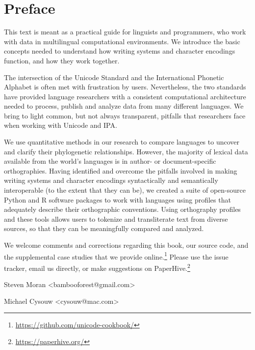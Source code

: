 \chapter{Preface}
\label{preface}

This text is meant as a practical guide for linguists and programmers, who work with data in multilingual computational environments. We introduce the basic concepts needed to understand how writing systems and character encodings function, and how they work together.

The intersection of the Unicode Standard and the International Phonetic Alphabet is often met with frustration by users. Nevertheless, the two standards have provided language researchers with a consistent computational architecture needed to process, publish and analyze data from many different languages. We bring to light common, but not always transparent, pitfalls that researchers face when working with Unicode and IPA. 

We use quantitative methods in our research to compare languages to uncover and clarify their phylogenetic relationships. However, the majority of lexical data available from the world's languages is in author- or document-specific orthographies. Having identified and overcome the pitfalls involved in making writing systems and character encodings syntactically and semantically interoperable (to the extent that they can be), we created a suite of open-source Python and R software packages to work with languages using profiles that adequately describe their orthographic conventions. Using orthography profiles and these tools allows users to tokenize and transliterate text from diverse sources, so that they can be meaningfully compared and analyzed.

We welcome comments and corrections regarding this book, our source code, and the supplemental case studies that we provide online.\footnote{\url{https://github.com/unicode-cookbook/}} Please use the issue tracker, email us directly, or make suggestions on PaperHive.\footnote{\url{https://paperhive.org/}}

\bigbreak
\noindent Steven Moran {\textless}bambooforest@gmail.com{\textgreater}

\noindent Michael Cysouw {\textless}cysouw@mac.com{\textgreater}
